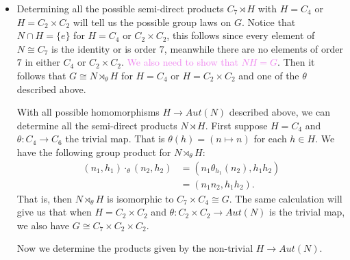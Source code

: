 \documentclass[12pt,letterpaper,boxed]{hmcpset}
\newcommand{\wg}[1]{\textcolor{violet}{#1}}
\begin{document}
\begin{solution}
\begin{itemize}
\item Determining all the possible semi-direct products $C_7 \rtimes
H$ with $H = C_4$ or $H = C_2 \times C_2$ will tell us the possible
group laws on $G$. Notice that $N \cap H = \{e \}$ for $H = C_4$ or
$C_2 \times C_2$, this follows since every element of $N \cong C_7$ is
the identity or is order $7$, meanwhile there are no elements of order
$7$ in either $C_4$ or $C_2 \times C_2$. 
\wg{We also need to show that $NH = G$}. 
Then it follows that $G \cong N \rtimes_\theta H$ for $H = C_4$ or $H
= C_2 \times C_2$ and one of the $\theta$ described above.

With all possible homomorphisms $H \to Aut(N)$ described above,
we can determine all the semi-direct products $N \rtimes H$.
First suppose $H = C_4$ and $\theta : C_4 \to C_6$ the trivial map.
That is $\theta(h) = (n \mapsto n)$ for each $h \in H$. We have the
following group product for $N \rtimes_\theta H$:
\begin{align*}
	(n_1, h_1) \cdot_\theta (n_2, h_2) 
		&= (n_1 \theta_{h_1}(n_2), h_1 h_2) \\
		&= (n_1 n_2, h_1 h_2).
\end{align*}
That is, then $N \rtimes_\theta H$ is isomorphic to $C_7 \times C_4
\cong G$.
The same calculation will give us that when $H = C_2 \times C_2$ and
$\theta : C_2 \times C_2 \to Aut(N)$ is the trivial map, we also have
$G \cong C_7 \times C_2 \times C_2$. 

Now we determine the products given by the non-trivial $H \to Aut(N)$.


\end{itemize}
\end{solution}

\newpage

\begin{problem}[4]
	\hfill
\end{problem}

\begin{solution}
\end{solution}

\newpage


\begin{problem}[4]
	\hfill
\end{problem}

\begin{solution}
\end{solution}

\newpage


\begin{problem}[4]
	\hfill
\end{problem}

\begin{solution}
\end{solution}

\newpage
\end{document}
